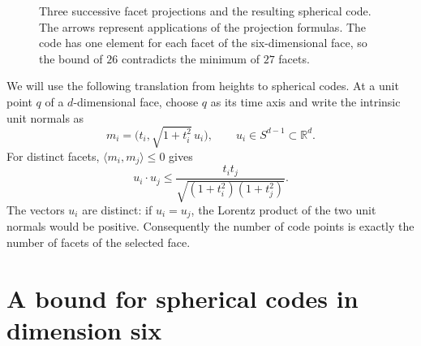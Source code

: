 \documentclass[11pt]{article}
\theoremstyle{remark}
\newcommand{\RR}{\mathbb R}
\newcommand{\ip}[2]{\langle #1,#2\rangle}
\begin{document}
\begin{figure}[t]
\centering
{}
\caption{Three successive facet projections and the resulting spherical code.
The arrows represent applications of the projection formulas.
The code has one element for each facet of the six-dimensional face,
so the bound of $26$ contradicts the minimum of $27$ facets.}
\label{fig:ladder}
\end{figure}

We will use the following translation from heights to spherical codes.
At a unit point $q$ of a $d$-dimensional face, choose $q$ as its time
axis and write the intrinsic unit normals as
\begin{equation}\label{eq:split}
 m_i=\bigl(t_i,\sqrt{1+t_i^2}\,u_i\bigr),
 \qquad u_i\in S^{d-1}\subset\RR^d.
\end{equation}
For distinct facets, $\ip{m_i}{m_j}\le0$ gives
\begin{equation}\label{eq:spatial}
 u_i\cdot u_j\le
 \frac{t_it_j}{\sqrt{(1+t_i^2)(1+t_j^2)}}.
\end{equation}
The vectors $u_i$ are distinct: if $u_i=u_j$, the Lorentz product of
the two unit normals would be positive. Consequently the number of
code points is exactly the number of facets of the selected face.

\section{A bound for spherical codes in dimension six}\label{sec:code}
\end{document}
